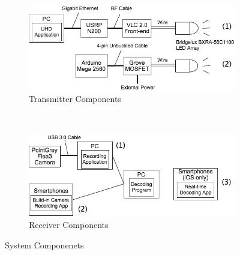 \begin{figure}[!t]
  \centering
    \begin{subfigure}[h]{0.5\textwidth}
      \includegraphics[width=\textwidth]{pic/tx_devices.png} 
      \caption{Transmitter Components} \label{fig:tx_component}
    \end{subfigure}
    \\
    \begin{subfigure}[h]{0.5\textwidth}
      \includegraphics[width=\textwidth]{pic/rx_devices.png} 
      \caption{Receiver Components} \label{fig:rx_component}
    \end{subfigure}
  \caption{System Componenets}
  \label{fig:components}
\end{figure}